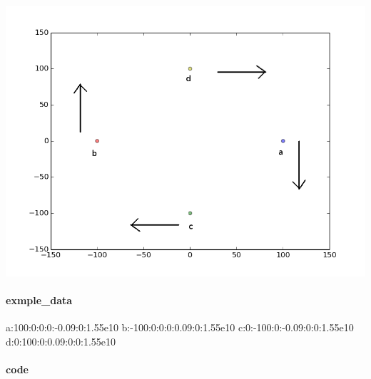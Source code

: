 \documentclass[15pt]{report}
\begin{document}
\centerline{\includegraphics[scale=0.5]{./img/ex1_0}}

\paragraph{exmple\_data}


\begin{code}
a:100:0:0:0:-0.09:0:1.55e10
b:-100:0:0:0:0.09:0:1.55e10
c:0:-100:0:-0.09:0:0:1.55e10
d:0:100:0:0.09:0:0:1.55e10
\end{code}

\paragraph{code}
\end{document}
